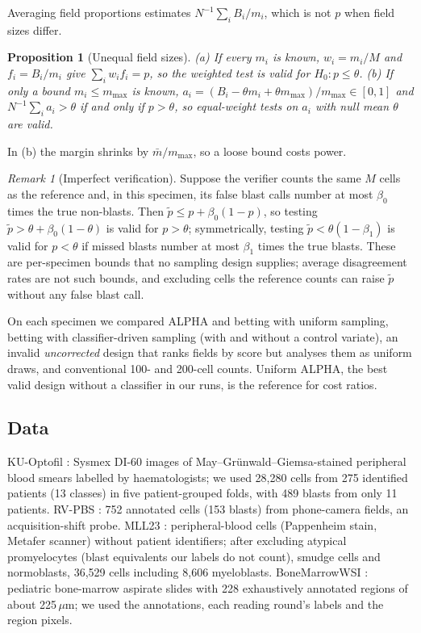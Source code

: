 \documentclass[preprint,12pt]{elsarticle}
\newtheorem{proposition}{Proposition}
\theoremstyle{remark}
\newtheorem{remark}{Remark}
\theoremstyle{definition}
\begin{document}
Averaging field proportions estimates $N^{-1}\sum_iB_i/m_i$, which is not $p$ when field sizes differ.
\begin{proposition}[Unequal field sizes]\label{prop:unequal}
(a) If every $m_i$ is known, $w_i=m_i/M$ and $f_i=B_i/m_i$ give $\sum_iw_if_i=p$, so the weighted test is valid for $H_0\colon p\le\theta$. (b) If only a bound $m_i\le m_{\max}$ is known, $a_i=(B_i-\theta m_i+\theta m_{\max})/m_{\max}\in[0,1]$ and $N^{-1}\sum_ia_i>\theta$ if and only if $p>\theta$, so equal-weight tests on $a_i$ with null mean $\theta$ are valid.
\end{proposition}
In (b) the margin shrinks by $\bar m/m_{\max}$, so a loose bound costs power.
\begin{remark}[Imperfect verification]\label{rem:verif}
Suppose the verifier counts the same $M$ cells as the reference and, in this specimen, its false blast calls number at most $\beta_0$ times the true non-blasts. Then $\tilde p\le p+\beta_0(1-p)$, so testing $\tilde p>\theta+\beta_0(1-\theta)$ is valid for $p>\theta$; symmetrically, testing $\tilde p<\theta(1-\beta_1)$ is valid for $p<\theta$ if missed blasts number at most $\beta_1$ times the true blasts. These are per-specimen bounds that no sampling design supplies; average disagreement rates are not such bounds, and excluding cells the reference counts can raise $\tilde p$ without any false blast call.
\end{remark}
On each specimen we compared ALPHA and betting with uniform sampling, betting with classifier-driven sampling (with and without a control variate), an invalid \emph{uncorrected} design that ranks fields by score but analyses them as uniform draws, and conventional 100- and 200-cell counts. Uniform ALPHA, the best valid design without a classifier in our runs, is the reference for cost ratios.

\subsection{Data}
KU-Optofil \cite{yarikan2026kuoptofil}: Sysmex DI-60 images of May--Gr\"unwald--Giemsa-stained peripheral blood smears labelled by haematologists; we used 28,280 cells from 275 identified patients (13 classes) in five patient-grouped folds, with 489 blasts from only 11 patients. RV-PBS \cite{rvpbs2024}: 752 annotated cells (153 blasts) from phone-camera fields, an acquisition-shift probe. MLL23 \cite{shetabboushehri2025mll23}: peripheral-blood cells (Pappenheim stain, Metafer scanner) without patient identifiers; after excluding atypical promyelocytes (blast equivalents our labels do not count), smudge cells and normoblasts, 36,529 cells including 8,606 myeloblasts. BoneMarrowWSI \cite{hofener2025bmwsi,hofener2025descriptor}: pediatric bone-marrow aspirate slides with 228 exhaustively annotated regions of about 225\,$\mu$m; we used the annotations, each reading round's labels and the region pixels.
\end{document}
